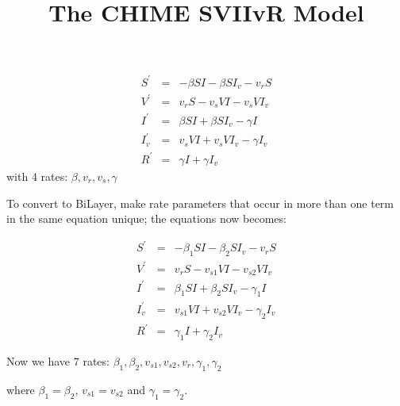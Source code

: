 \documentclass[10pt]{article}
\title{The CHIME SVIIvR Model}
\begin{document}
\maketitle

\begin{eqnarray}
S^\prime &=& - \beta S I - \beta S I_{v} - v_{r} S \\
V^\prime &=& v_{r} S - v_{s} V I - v_{s} V I_{v} \\
I^\prime &=& \beta S I + \beta S I_{v} - \gamma I \\
I_{v}^\prime &=& v_{s} V I + v_{s} V I_{v} - \gamma I_{v} \\
R^\prime &=& \gamma I + \gamma I_v
\end{eqnarray}
with 4 rates: $\beta, v_r, v_s, \gamma$

\vspace{0.5cm}

To convert to BiLayer, make rate parameters that occur in more than one term in the same equation unique; the equations now becomes:

\begin{eqnarray}
S^\prime &=& - \beta_1 S I - \beta_2 S I_{v} - v_{r} S \\
V^\prime &=& v_{r} S - v_{s1} V I - v_{s2} V I_{v} \\
I^\prime &=& \beta_1 S I + \beta_2 S I_{v} - \gamma_1 I \\
I_{v}^\prime &=& v_{s1} V I + v_{s2} V I_{v} - \gamma_2 I_{v} \\
R^\prime &=& \gamma_1 I + \gamma_2 I_v
\end{eqnarray}

\noindent Now we have 7 rates: $\beta_1, \beta_2, v_{s1}, v_{s2}, v_r, \gamma_1, \gamma_2$

\noindent where $\beta_1 = \beta_2$, $v_{s1} = v_{s2}$ and $\gamma_1 = \gamma_2$.
\end{document}
